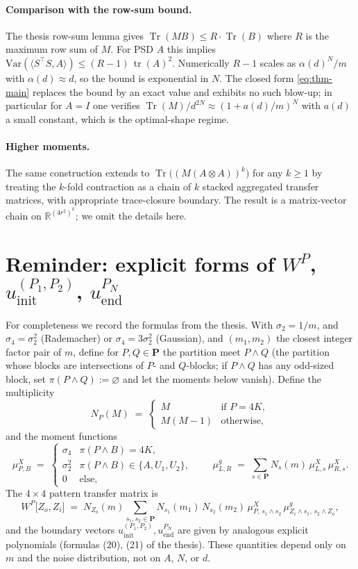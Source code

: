 \documentclass[11pt]{article}
\DeclareMathOperator{\Tr}{Tr}
\DeclareMathOperator{\tr}{tr}
\newcommand{\IR}{\mathbb{R}}
\newcommand{\bP}{\boldsymbol{P}}
\begin{document}
\paragraph{Comparison with the row-sum bound.} The thesis row-sum lemma
gives $\Tr(M B) \le R\cdot\Tr(B)$ where $R$ is the maximum row sum of $M$.
For PSD $A$ this implies
$\mathrm{Var}(\langle S^\top S,A\rangle)\le (R-1)\,\tr(A)^2$. Numerically
$R - 1$ scales as $\alpha(d)^N/m$ with $\alpha(d)\approx d$, so the bound
is exponential in $N$. The closed form \eqref{eq:thm-main} replaces the
bound by an exact value and exhibits no such blow-up; in particular for
$A = I$ one verifies $\Tr(M)/d^{2N} \approx (1+a(d)/m)^N$ with $a(d)$ a
small constant, which is the optimal-shape regime.

\paragraph{Higher moments.} The same construction extends to
$\Tr\bigl((M(A\otimes A))^k\bigr)$ for any $k\ge 1$ by treating the $k$-fold
contraction as a chain of $k$ stacked aggregated transfer matrices, with
appropriate trace-closure boundary. The result is a matrix-vector chain on
$\IR^{(4r^2)^k}$; we omit the details here.

\appendix

\section{Reminder: explicit forms of $W^P$, $u_{\mathrm{init}}^{(P_1,P_2)}$,
$u_{\mathrm{end}}^{P_N}$}\label{app:W-formulas}

For completeness we record the formulas from the thesis. With
$\sigma_2 = 1/m$, and $\sigma_4 = \sigma_2^2$ (Rademacher) or
$\sigma_4 = 3\sigma_2^2$ (Gaussian), and $(m_1,m_2)$ the closest integer
factor pair of $m$, define for $P, Q\in\bP$ the partition meet
$P\wedge Q$ (the partition whose blocks are intersections of $P$- and
$Q$-blocks; if $P\wedge Q$ has any odd-sized block, set
$\pi(P\wedge Q):=\varnothing$ and let the moments below vanish). Define the
multiplicity
\[
N_P(M) \;=\;
\begin{cases}
M & \text{if }P = 4K,\\
M(M-1) & \text{otherwise},
\end{cases}
\]
and the moment functions
\[
\mu^X_{P,B} \;=\;
\begin{cases}
\sigma_4 & \pi(P\wedge B) = 4K,\\
\sigma_2^2 & \pi(P\wedge B) \in \{A, U_1, U_2\},\\
0 & \text{else,}
\end{cases}
\qquad
\mu^g_{L,R} \;=\;\sum_{s\in\bP} N_s(m)\,\mu^X_{L,s}\,\mu^X_{R,s}.
\]
The $4\times 4$ pattern transfer matrix is
\begin{equation}\label{eq:W-explicit}
W^P\bigl[Z_o,Z_i\bigr]
\;=\;
N_{Z_o}(m)\sum_{s_1,s_2\in\bP}
N_{s_1}(m_1)\,N_{s_2}(m_2)\,
\mu^X_{P,\,s_1\wedge s_2}\,
\mu^g_{Z_i\wedge s_1,\,s_2\wedge Z_o},
\end{equation}
and the boundary vectors $u_{\mathrm{init}}^{(P_1,P_2)},u_{\mathrm{end}}^{P_N}$
are given by analogous explicit polynomials (formulas (20), (21) of the
thesis). These quantities depend only on $m$ and the noise distribution,
not on $A$, $N$, or $d$.
\end{document}
